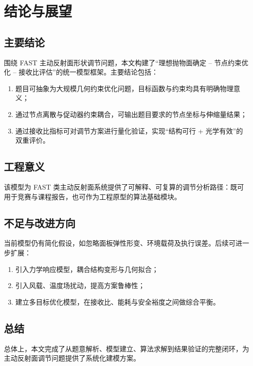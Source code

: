 \chapter{结论与展望}

\section{主要结论}
围绕 FAST 主动反射面形状调节问题，本文构建了“理想抛物面确定 -- 节点约束优化 -- 接收比评估”的统一模型框架。主要结论包括：
\begin{enumerate}
  \item 题目可抽象为大规模几何约束优化问题，目标函数与约束均具有明确物理意义；
  \item 通过节点离散与促动器约束耦合，可输出题目要求的节点坐标与伸缩量结果；
  \item 通过接收比指标可对调节方案进行量化验证，实现“结构可行 + 光学有效”的双重评价。
\end{enumerate}

\section{工程意义}
该模型为 FAST 类主动反射面系统提供了可解释、可复算的调节分析路径：既可用于竞赛与课程报告，也可作为工程原型的算法基础模块。

\section{不足与改进方向}
当前模型仍有简化假设，如忽略面板弹性形变、环境载荷及执行误差。后续可进一步扩展：
\begin{enumerate}
  \item 引入力学响应模型，耦合结构变形与几何拟合；
  \item 引入风载、温度场扰动，提高方案鲁棒性；
  \item 建立多目标优化模型，在接收比、能耗与安全裕度之间做综合平衡。
\end{enumerate}

\section{总结}
总体上，本文完成了从题意解析、模型建立、算法求解到结果验证的完整闭环，为主动反射面调节问题提供了系统化建模方案。
